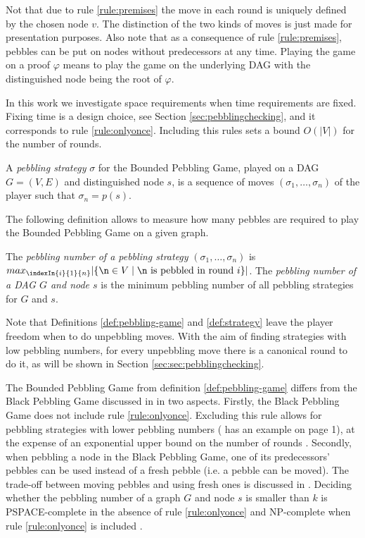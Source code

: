 Not that due to rule \ref{rule:premises} the move in each round is uniquely defined by the chosen node $v$.
The distinction of the two kinds of moves is just made for presentation purposes.
Also note that as a consequence of rule \ref{rule:premises}, pebbles can be put on nodes without predecessors at any time.
Playing the game on a proof $\varphi$ means to play the game on the underlying DAG with the distinguished node being the root of $\varphi$.

In this work we investigate space requirements when time requirements are fixed.
Fixing time is a design choice, see Section \ref{sec:pebblingchecking}, and it corresponds to rule \ref{rule:onlyonce}.
Including this rules sets a bound $O(|V|)$ for the number of rounds.

\begin{definition}[Strategy]
\label{def:strategy}
A \emph{pebbling strategy} $\sigma$ for the Bounded Pebbling Game, played on a DAG $G = (V,E)$ and distinguished node $s$, is a sequence of moves $(\sigma_1,\ldots,\sigma_n)$ of the player such that $\sigma_n = p(s)$.
\end{definition}

The following definition allows to measure how many pebbles are required to play the Bounded Pebbling Game on a given graph.

\begin{definition}
The \emph{pebbling number of a pebbling strategy} $(\sigma_1,\ldots,\sigma_n)$ is 
$ max_{\indexIn{i}{1}{n}}|\{ \n \in V \mid \n \text{ is pebbled in round } i\}| $.
The \emph{pebbling number of a DAG $G$ and node $s$} is the minimum pebbling number of all pebbling strategies for $G$ and $s$.
\end{definition}

Note that Definitions \ref{def:pebbling-game} and \ref{def:strategy} leave the player freedom when to do unpebbling moves.
With the aim of finding strategies with low pebbling numbers, for every unpebbling move there is a canonical round to do it, as will be shown in Section \ref{sec:sec:pebblingchecking}.

\noindent
The Bounded Pebbling Game from definition \ref{def:pebbling-game} differs from the Black Pebbling Game discussed in \cite{Hertel2007,Pippenger1982} in two aspects. 
Firstly, the Black Pebbling Game does not include rule \ref{rule:onlyonce}. 
Excluding this rule allows for pebbling strategies with lower pebbling numbers (\cite{Sethi1975} has an example on page 1), at the expense of an exponential upper bound on the number of rounds \cite{EmdeBoas1979}.
Secondly, when pebbling a node in the Black Pebbling Game, one of its predecessors' pebbles can be used instead of a fresh pebble (i.e. a pebble can be moved). 
The trade-off between moving pebbles and using fresh ones is discussed in \cite{EmdeBoas1979}. 
Deciding whether the pebbling number of a graph $G$ and node $s$ is smaller than $k$ is PSPACE-complete in the absence of rule \ref{rule:onlyonce} \cite{Gilbert1980} and NP-complete when rule \ref{rule:onlyonce} is included \cite{Sethi1975}.

